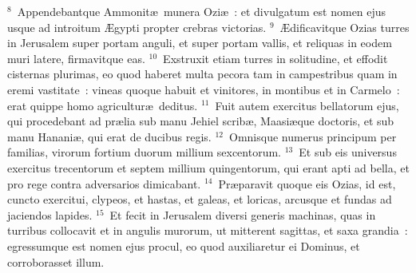 ${}^{8}$~Appendebantque Ammonit\ae\ munera Ozi\ae~: et divulgatum est nomen ejus usque ad introitum \AE gypti propter crebras victorias.
${}^{9}$~\AE dificavitque Ozias turres in Jerusalem super portam anguli, et super portam vallis, et reliquas in eodem muri latere, firmavitque eas.
${}^{10}$~Exstruxit etiam turres in solitudine, et effodit cisternas plurimas, eo quod haberet multa pecora tam in campestribus quam in eremi vastitate~: vineas quoque habuit et vinitores, in montibus et in Carmelo~: erat quippe homo agricultur\ae\ deditus.
${}^{11}$~Fuit autem exercitus bellatorum ejus, qui procedebant ad pr\ae lia sub manu Jehiel scrib\ae , Maasi\ae que doctoris, et sub manu Hanani\ae , qui erat de ducibus regis.
${}^{12}$~Omnisque numerus principum per familias, virorum fortium duorum millium sexcentorum.
${}^{13}$~Et sub eis universus exercitus trecentorum et septem millium quingentorum, qui erant apti ad bella, et pro rege contra adversarios dimicabant.
${}^{14}$~Pr\ae paravit quoque eis Ozias, id est, cuncto exercitui, clypeos, et hastas, et galeas, et loricas, arcusque et fundas ad jaciendos lapides.
${}^{15}$~Et fecit in Jerusalem diversi generis machinas, quas in turribus collocavit et in angulis murorum, ut mitterent sagittas, et saxa grandia~: egressumque est nomen ejus procul, eo quod auxiliaretur ei Dominus, et corroborasset illum.



